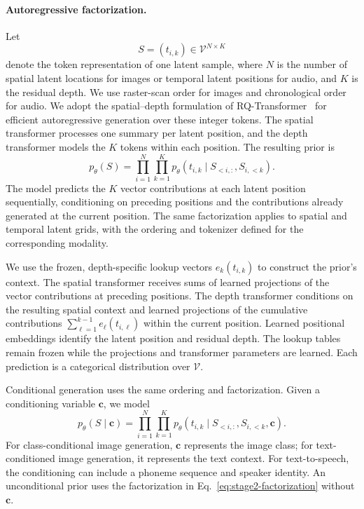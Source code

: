 
\paragraph{Autoregressive factorization.}
Let
\begin{equation}
    S=(t_{i,k})\in\mathcal{V}^{N\times K}
\end{equation}
denote the token representation of one latent sample, where $N$ is the number of spatial latent locations for images or temporal latent positions for audio, and $K$ is the residual depth. We use raster-scan order for images and chronological order for audio. We adopt the spatial--depth formulation of RQ-Transformer~\citep{lee2022rqvae} for efficient autoregressive generation over these integer tokens. The spatial transformer processes one summary per latent position, and the depth transformer models the $K$ tokens within each position. The resulting prior is
\begin{equation}
    p_{\theta}(S)=\prod_{i=1}^{N}\prod_{k=1}^{K}p_{\theta}\!\left(t_{i,k}\mid S_{<i,:},S_{i,<k}\right).
    \label{eq:stage2-factorization}
\end{equation}
The model predicts the $K$ vector contributions at each latent position sequentially, conditioning on preceding positions and the contributions already generated at the current position. The same factorization applies to spatial and temporal latent grids, with the ordering and tokenizer defined for the corresponding modality.

We use the frozen, depth-specific lookup vectors $e_k(t_{i,k})$ to construct the prior's context. The spatial transformer receives sums of learned projections of the vector contributions at preceding positions. The depth transformer conditions on the resulting spatial context and learned projections of the cumulative contributions $\sum_{\ell=1}^{k-1}e_{\ell}(t_{i,\ell})$ within the current position. Learned positional embeddings identify the latent position and residual depth. The lookup tables remain frozen while the projections and transformer parameters are learned. Each prediction is a categorical distribution over $\mathcal{V}$.

Conditional generation uses the same ordering and factorization. Given a conditioning variable $\boldsymbol{c}$, we model
\begin{equation}
    p_{\theta}(S\mid\boldsymbol{c})=\prod_{i=1}^{N}\prod_{k=1}^{K}p_{\theta}\!\left(t_{i,k}\mid S_{<i,:},S_{i,<k},\boldsymbol{c}\right).
    \label{eq:stage2-conditional-factorization}
\end{equation}
For class-conditional image generation, $\boldsymbol{c}$ represents the image class; for text-conditioned image generation, it represents the text context. For text-to-speech, the conditioning can include a phoneme sequence and speaker identity. An unconditional prior uses the factorization in Eq.~\eqref{eq:stage2-factorization} without $\boldsymbol{c}$.

